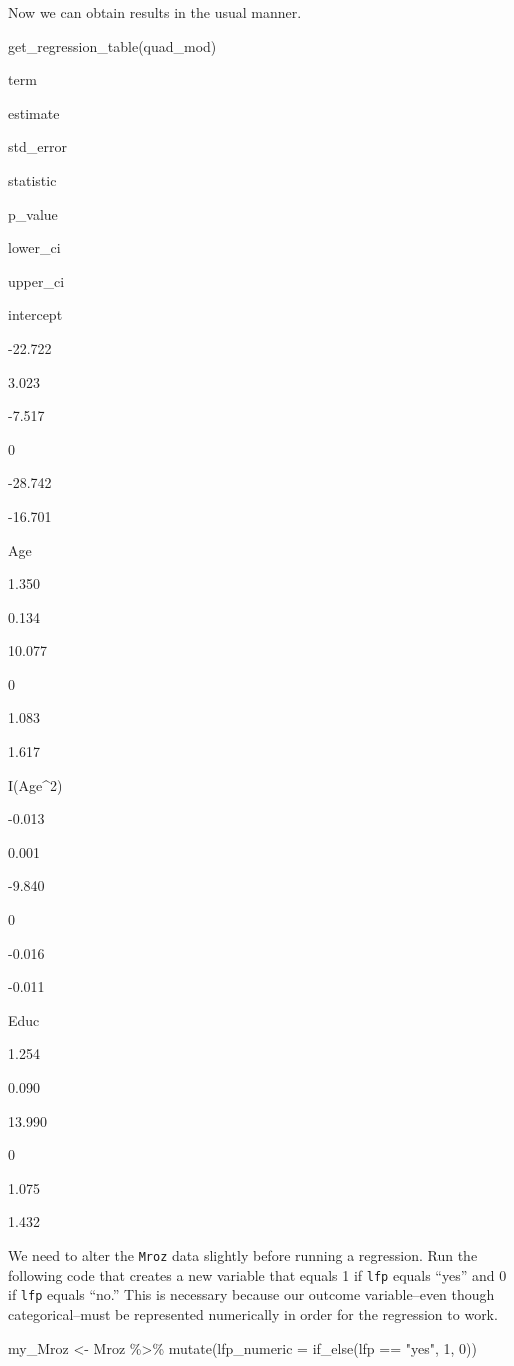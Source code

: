 \documentclass[
]{book}
\makeatletter
\newenvironment{Shaded}{\begin{snugshade}}{\end{snugshade}}
\newcommand{\AttributeTok}[1]{\textcolor[rgb]{0.61,0.61,0.61}{#1}}
\newcommand{\DecValTok}[1]{\textcolor[rgb]{0.06,0.06,0.06}{#1}}
\newcommand{\FunctionTok}[1]{\textcolor[rgb]{0,0,0}{#1}}
\newcommand{\NormalTok}[1]{#1}
\newcommand{\OtherTok}[1]{\textcolor[rgb]{0.37,0.37,0.37}{#1}}
\newcommand{\SpecialCharTok}[1]{\textcolor[rgb]{0,0,0}{#1}}
\newcommand{\StringTok}[1]{\textcolor[rgb]{0.5,0.5,0.5}{#1}}
\newenvironment{kframe}{%
\medskip{}
\setlength{\fboxsep}{.8em}
 \def\at@end@of@kframe{}%
 \ifinner\ifhmode%
  \def\at@end@of@kframe{\end{minipage}}%
  \begin{minipage}{\columnwidth}%
 \fi\fi%
 \def\FrameCommand##1{\hskip\@totalleftmargin \hskip-\fboxsep
 \colorbox{shadecolor}{##1}\hskip-\fboxsep
     \hskip-\linewidth \hskip-\@totalleftmargin \hskip\columnwidth}%
 \MakeFramed {\advance\hsize-\width
   \@totalleftmargin\z@ \linewidth\hsize
   \@setminipage}}%
 {\par\unskip\endMakeFramed%
 \at@end@of@kframe}
\renewenvironment{Shaded}{\begin{kframe}}{\end{kframe}}
\makeatother
\begin{document}
Now we can obtain results in the usual manner.

\begin{Shaded}
\begin{Highlighting}[]
\FunctionTok{get\_regression\_table}\NormalTok{(quad\_mod)}
\end{Highlighting}
\end{Shaded}

term

estimate

std\_error

statistic

p\_value

lower\_ci

upper\_ci

intercept

-22.722

3.023

-7.517

0

-28.742

-16.701

Age

1.350

0.134

10.077

0

1.083

1.617

I(Age\^{}2)

-0.013

0.001

-9.840

0

-0.016

-0.011

Educ

1.254

0.090

13.990

0

1.075

1.432

We need to alter the \texttt{Mroz} data slightly before running a regression. Run the following code that creates a new variable that equals 1 if \texttt{lfp} equals ``yes'' and 0 if \texttt{lfp} equals ``no.'' This is necessary because our outcome variable--even though categorical--must be represented numerically in order for the regression to work.

\begin{Shaded}
\begin{Highlighting}[]
\NormalTok{my\_Mroz }\OtherTok{\textless{}{-}}\NormalTok{ Mroz }\SpecialCharTok{\%\textgreater{}\%} 
  \FunctionTok{mutate}\NormalTok{(}\AttributeTok{lfp\_numeric =} \FunctionTok{if\_else}\NormalTok{(lfp }\SpecialCharTok{==} \StringTok{"yes"}\NormalTok{, }\DecValTok{1}\NormalTok{, }\DecValTok{0}\NormalTok{))}
\end{Highlighting}
\end{Shaded}
\end{document}
